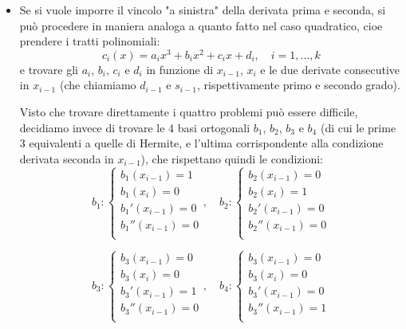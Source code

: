 \documentclass[a4paper,11pt]{article}
\begin{document}
\begin{itemize}
	\item Se si vuole imporre il vincolo "a sinistra" della derivata prima e seconda, si può procedere in maniera analoga a quanto fatto nel caso quadratico, cioe prendere i tratti polinomiali:
		$$
		c_i(x) = a_i x^3 + b_i x^2 + c_i x + d_i, \quad i = 1, ..., k
		$$
		e trovare gli $a_i$, $b_i$, $c_i$ e $d_i$ in funzione di $x_{i - 1}$, $x_i$ e le due derivate consecutive in $x_{i - 1}$ (che chiamiamo $d_{i - 1}$ e $s_{i- 1}$, rispettivamente primo e secondo grado).
		
		Visto che trovare direttamente i quattro problemi può essere difficile, decidiamo invece di trovare le 4 basi ortogonali $b_1$, $b_2$, $b_3$ e $b_4$ (di cui le prime 3 equivalenti a quelle di Hermite, e l'ultima corrispondente alla condizione derivata seconda in $x_{i - 1}$), che rispettano quindi le condizioni:
		$$
		b_1 : 
			\begin{cases}
				b_1(x_{i - 1}) = 1 \\
				b_1(x_i) = 0 \\
				b_1'(x_{i - 1}) = 0 \\
				b_1''(x_{i - 1}) = 0 \\
			\end{cases}, \quad
		b_2 : 
			\begin{cases}
				b_2(x_{i - 1}) = 0 \\
				b_2(x_i) = 1 \\
				b_2'(x_{i - 1}) = 0 \\
				b_2''(x_{i - 1}) = 0 \\
			\end{cases}
		$$

		$$
		b_3 : 
			\begin{cases}
				b_3(x_{i - 1}) = 0 \\
				b_3(x_i) = 0 \\
				b_3'(x_{i - 1}) = 1 \\
				b_3''(x_{i - 1}) = 0 \\
			\end{cases}, \quad
		b_4 : 
			\begin{cases}
				b_3(x_{i - 1}) = 0 \\
				b_3(x_i) = 0 \\
				b_3'(x_{i - 1}) = 0 \\
				b_3''(x_{i - 1}) = 1 \\
			\end{cases}
		$$


\end{itemize}
\end{document}
